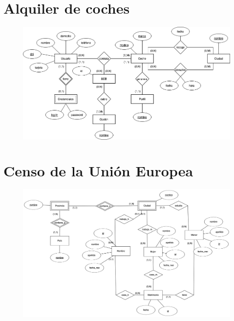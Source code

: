 \documentclass[a4paper]{article}
\begin{document}
\section{Alquiler de coches}
\begin{figure}[H]
    \centering
    \includegraphics[width=\textwidth]{figs/ejercicio-8}
\end{figure}

\section{Censo de la Unión Europea}
\begin{figure}[H]
    \centering
    \includegraphics[width=\textwidth]{figs/ejercicio-9}
\end{figure}
\end{document}
